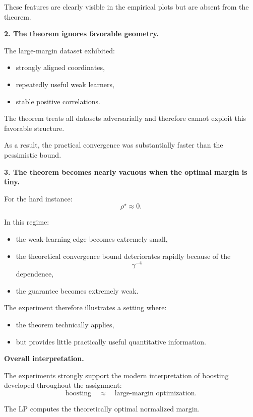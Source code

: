 \documentclass[11pt]{article}
\begin{document}
\begin{enumerate}
\begin{solutionbox}
These features are clearly visible in the empirical plots but are absent from the theorem.

\bigskip

\textbf{2. The theorem ignores favorable geometry.}

The large-margin dataset exhibited:
\begin{itemize}
    \item strongly aligned coordinates,
    \item repeatedly useful weak learners,
    \item stable positive correlations.
\end{itemize}

The theorem treats all datasets adversarially and therefore cannot exploit this favorable structure.

As a result, the practical convergence was substantially faster than the pessimistic bound.

\bigskip

\textbf{3. The theorem becomes nearly vacuous when the optimal margin is tiny.}

For the hard instance:
\[
\rho^\star \approx 0.
\]

In this regime:
\begin{itemize}
    \item the weak-learning edge becomes extremely small,
    \item the theoretical convergence bound deteriorates rapidly because of the
    \[
    \gamma^{-4}
    \]
    dependence,
    \item the guarantee becomes extremely weak.
\end{itemize}

The experiment therefore illustrates a setting where:
\begin{itemize}
    \item the theorem technically applies,
    \item but provides little practically useful quantitative information.
\end{itemize}

\medskip

\textbf{Overall interpretation.}

The experiments strongly support the modern interpretation of boosting developed throughout the assignment:
\[
\text{boosting}
\quad\approx\quad
\text{large-margin optimization}.
\]

The LP computes the theoretically optimal normalized margin.


\end{solutionbox}
\end{enumerate}
\end{document}
